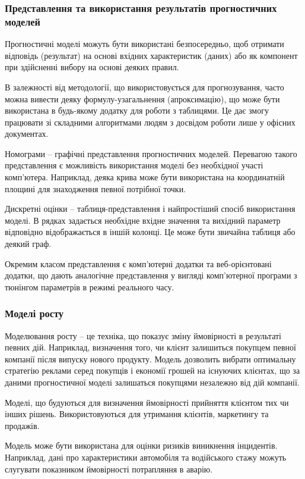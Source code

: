 \subsubsection{Представлення та використання результатів прогностичних моделей}
Прогностичні моделі можуть бути використані безпосередньо, щоб отримати відповідь (результат) на основі вхідних характеристик (даних) або як компонент при здійсненні вибору на основі деяких правил.

В залежності від методології, що використовується для прогнозування, часто можна вивести деяку формулу-узагальнення (апроксимацію), що може бути використана в будь-якому додатку для роботи з таблицями. Це дає змогу працювати зі складними алгоритмами людям з досвідом роботи лише у офісних документах.

Номограми – графічні представлення прогностичних моделей. Перевагою такого представлення є можливість використання моделі без необхідної участі комп'ютера. Наприклад, деяка крива може бути використана на координатній площині для знаходження певної потрібної точки.

Дискретні оцінки – таблиця-представлення і найпростіший спосіб використання моделі. В рядках задається необхідне вхідне значення та вихідний параметр відповідно відображається в іншій колонці. Це може бути звичайна таблиця або деякий граф.

Окремим класом представлення є комп'ютерні додатки та веб-орієнтовані додатки, що дають аналогічне представлення у вигляді комп'ютерної програми з тюнінгом параметрів в режимі реального часу.

\subsubsection{Моделі росту}
Моделювання росту – це техніка, що показує зміну ймовірності в результаті певних дій. Наприклад, визначення того, чи клієнт залишиться покупцем певної компанії після випуску нового продукту. Модель дозволить вибрати оптимальну стратегію реклами серед покупців і економії грошей на існуючих клієнтах, що за даними прогностичної моделі залишаться покупцями незалежно від дій компанії.

Моделі, що будуються для визначення ймовірності прийняття клієнтом тих чи інших рішень. Використовуються для утримання клієнтів, маркетингу та продажів.

Модель може бути використана для оцінки ризиків виникнення інцидентів. Наприклад, дані про характеристики автомобіля та водійського стажу можуть слугувати показником ймовірності потрапляння в аварію.


